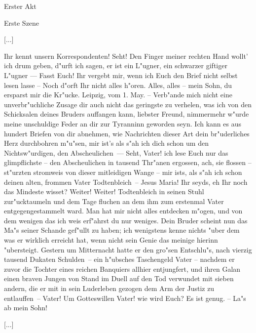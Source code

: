 
\begin{center}

\Large{Erster Akt}

\large{Erste Szene}

\end{center}


[...]

\begin{drama}

\franspeaks {} Ihr kennt unsern Korrespondenten! Seht! Den Finger meiner rechten Hand wollt' ich drum geben, d"urft ich sagen, er ist ein L"ugner, ein schwarzer giftiger L"ugner --- Fasst Euch! Ihr vergebt mir, wenn ich Euch den Brief nicht selbst lesen lasse -- Noch d"orft Ihr nicht alles h"oren.
\moorspeaks Alles, alles -- mein Sohn, du ersparst mir die Kr"ucke.
\franspeaks {} \frqq Leipzig, vom 1. May. -- Verb"ande mich nicht eine unverbr"uchliche Zusage dir auch nicht das geringste zu verhelen, was ich von den Schicksalen deines Bruders auffangen kann, liebster Freund, nimmermehr w"urde meine unschuldige Feder an dir zur Tyranninn geworden seyn. Ich kann es aus hundert Briefen von dir abnehmen, wie Nachrichten dieser Art dein br"uderliches Herz durchbohren m"u"sen, mir ist's als s"ah ich dich schon um den Nichtsw"urdigen, den Abscheulichen\flqq \ ---  Seht, Vater! ich lese Euch nur das glimpflichste -- \frqq den Abscheulichen in tausend Thr"anen ergossen\flqq , ach, sie flossen -- st"urzten stromweis von dieser mitleidigen Wange -- \frqq mir ists, als s"ah ich schon deinen alten, frommen Vater Todtenbleich\flqq \ -- Jesus Maria! Ihr seyds, eh Ihr noch das Mindeste wisset?
\moorspeaks Weiter! Weiter!
\franspeaks \frqq Todtenbleich in seinen Stuhl zur"ucktaumeln und dem Tage fluchen an dem ihm zum erstenmal Vater entgegengestammelt ward. Man hat mir nicht alles entdecken m"ogen, und von dem wenigen das ich weis erf"ahrst du nur weniges. Dein Bruder scheint nun das Ma"s seiner Schande gef"ullt zu haben; ich wenigstens kenne nichts "uber dem was er wirklich erreicht hat, wenn nicht sein Genie das meinige hierinn "ubersteigt. Gestern um Mitternacht hatte er den gro"sen Entschlu"s, nach vierzig tausend Dukaten Schulden\flqq \ -- ein h"ubsches Taschengeld Vater -- \frqq nachdem er zuvor die Tochter eines reichen Banquiers allhier entjungfert, und ihren Galan einen braven Jungen von Stand im Duell auf den Tod verwundet mit sieben andern, die er mit in sein Luderleben gezogen dem Arm der Justiz zu entlauffen\flqq \ -- Vater! Um Gotteswillen Vater! wie wird Euch?
\moorspeaks Es ist genug. -- La"s ab mein Sohn!

\end{drama}

[...]

\endinput
